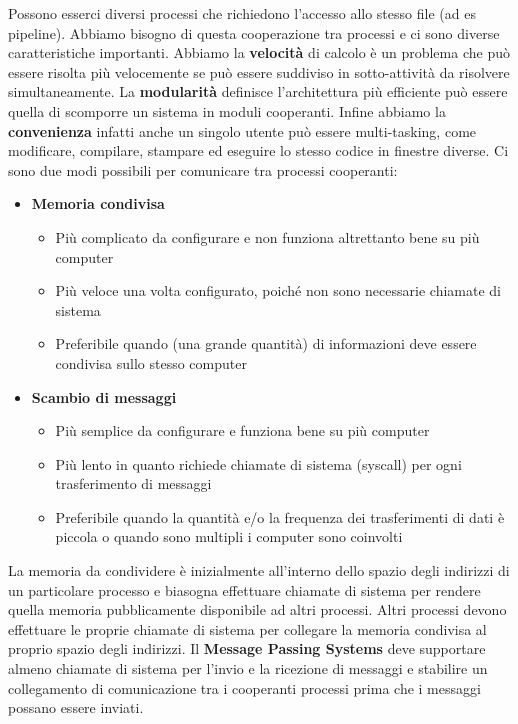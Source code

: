 \documentclass{article}
\begin{document}
Possono esserci diversi processi che richiedono l'accesso allo stesso file (ad es pipeline). Abbiamo bisogno di questa cooperazione tra processi e ci sono diverse caratteristiche importanti. Abbiamo la \textbf{velocità} di calcolo è un problema che può essere risolta più velocemente se può essere suddiviso in sotto-attività da risolvere simultaneamente. La \textbf{modularità} definisce l'architettura più efficiente può essere quella di scomporre un sistema in moduli cooperanti. Infine abbiamo la \textbf{convenienza} infatti anche un singolo utente può essere multi-tasking, come modificare, compilare, stampare ed eseguire lo stesso codice in finestre diverse.
Ci sono due modi possibili per comunicare tra processi cooperanti:
\begin{itemize}
    \item \textbf{Memoria condivisa}
    \begin{itemize}
        \item Più complicato da configurare e non funziona altrettanto bene su più computer
        \item Più veloce una volta configurato, poiché non sono necessarie chiamate di sistema
        \item Preferibile quando (una grande quantità) di informazioni deve essere condivisa sullo stesso computer
    \end{itemize}
    \item \textbf{Scambio di messaggi} 
    \begin{itemize}
        \item Più semplice da configurare e funziona bene su più computer
        \item Più lento in quanto richiede chiamate di sistema (syscall) per ogni trasferimento di messaggi
        \item Preferibile quando la quantità e/o la frequenza dei trasferimenti di dati è piccola o quando sono multipli i computer sono coinvolti
    \end{itemize}
\end{itemize}

La memoria da condividere è inizialmente all'interno dello spazio degli indirizzi di un particolare processo e biasogna effettuare chiamate di sistema per rendere quella memoria pubblicamente disponibile ad altri processi. Altri processi devono effettuare le proprie chiamate di sistema per collegare la memoria condivisa al proprio spazio degli indirizzi. 
Il \textbf{Message Passing Systems} deve supportare almeno chiamate di sistema per l'invio e la ricezione di messaggi e stabilire un collegamento di comunicazione tra i cooperanti processi prima che i messaggi possano essere inviati.\\
\linebreak
\linebreak
\linebreak
\linebreak
\end{document}
